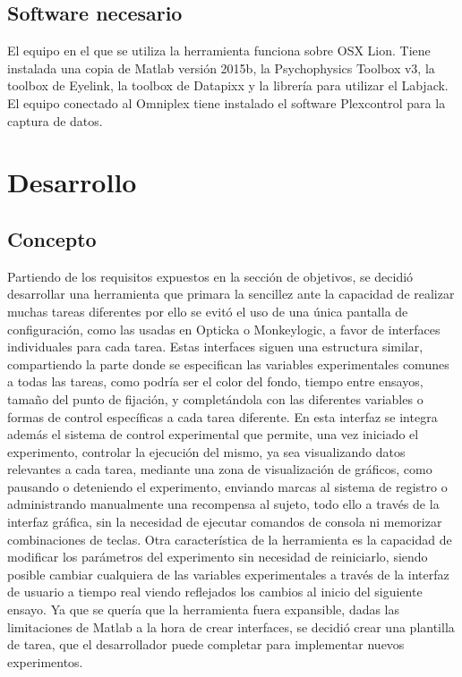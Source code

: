 \documentclass[conference]{IEEEtran}
\begin{document}
\subsection{Software necesario}
El equipo en el que se utiliza la herramienta funciona sobre OSX Lion. Tiene instalada una copia de Matlab versión 2015b, la Psychophysics Toolbox v3, la toolbox de Eyelink, la toolbox de Datapixx y la librería para utilizar el Labjack.
El equipo conectado al Omniplex tiene instalado el software Plexcontrol\cite{plexcontrol} para la captura de datos.

\section{Desarrollo}
\subsection{Concepto}
 
Partiendo de los requisitos expuestos en la sección de objetivos, se decidió desarrollar una herramienta que primara la sencillez ante la capacidad de realizar muchas tareas diferentes por ello se evitó el uso de una única pantalla de configuración, como las usadas en Opticka o Monkeylogic, a favor de interfaces individuales para cada tarea. 
Estas interfaces siguen una estructura similar, compartiendo la parte donde se especifican las variables experimentales comunes a todas las tareas, como podría ser el color del fondo, tiempo entre ensayos, tamaño del punto de fijación, y completándola con las diferentes variables o formas de control específicas a cada tarea diferente. En esta interfaz se integra además el sistema de control experimental que permite, una vez iniciado el experimento, controlar la ejecución del mismo, ya sea visualizando datos relevantes a cada tarea, mediante una zona de visualización de gráficos, como pausando o deteniendo el experimento, enviando marcas al sistema de registro o administrando manualmente una recompensa al sujeto, todo ello a través de la interfaz gráfica, sin la necesidad de ejecutar comandos de consola ni memorizar combinaciones de teclas. 
Otra característica de la herramienta es la capacidad de modificar los parámetros del experimento sin necesidad de reiniciarlo, siendo posible cambiar cualquiera de las variables experimentales a través de la interfaz de usuario a tiempo real viendo reflejados los cambios al inicio del siguiente ensayo.
Ya que se quería que la herramienta fuera expansible, dadas las limitaciones de Matlab a la hora de crear interfaces, se decidió crear una plantilla de tarea, que el desarrollador puede completar para implementar nuevos experimentos.
\end{document}
